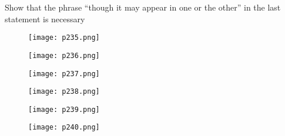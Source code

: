 Show that the phrase “though it may appear in one or the other” in the last statement is necessary











\begin{figure}[H]
	  \texttt{[image: p235.png]}
	  \caption{}\label{fig:p235}
	\endminipage\hfill
	  \texttt{[image: p236.png]}
	  \caption{}\label{fig:p236}
	\endminipage\hfill
	  \texttt{[image: p237.png]}
	  \caption{}\label{fig:p237}
	\endminipage
\end{figure}




\begin{figure}[H]
	  \texttt{[image: p238.png]}
	  \caption{}\label{fig:p238}
	\endminipage\hfill
	  \texttt{[image: p239.png]}
	  \caption{}\label{fig:p239}
	\endminipage\hfill
	  \texttt{[image: p240.png]}
	  \caption{}\label{fig:p240}
	\endminipage
\end{figure}






